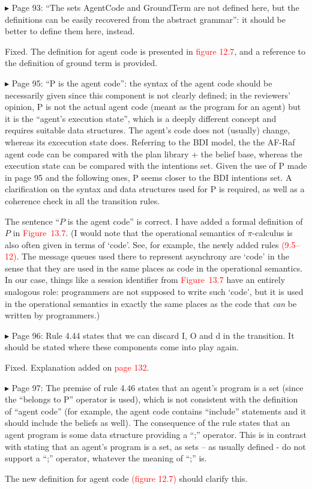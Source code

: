 \documentclass{article}
\newcommand*\R[1]{\textcolor{red}{#1}} %
\newenvironment{them}%
  {\bigskip\noindent\begingroup\color{blue}$\blacktriangleright$\enspace}%
  {\endgroup\par}
\begin{document}
\begin{them}
Page 93:
``The sets AgentCode and GroundTerm are not defined here, but the definitions
can be easily recovered from the abstract grammar'': it should be better to
define them here, instead.
\end{them}
Fixed. The definition for agent code is presented in \R{figure 12.7}, and a
reference to the definition of ground term is provided.

\begin{them}
Page 95:
``P is the agent code'': the syntax of the agent code should be necessarily given
since this component is not clearly defined; in the reviewers' opinion, P is
not the actual agent code (meant as the program for an agent) but it is the
``agent's execution state'', which is a deeply different concept and requires
suitable data structures. The agent's code does not (usually) change, whereas
its excecution state does. Referring to the BDI model, the the AF-Raf agent
code can be compared with the plan library + the belief base, whereas the
execution state can be compared with the intentions set. Given the use of P
made in page 95 and the following ones, P seems closer to the BDI intentions
set. A clarification on the syntax and data structures used for P is required,
as well as a coherence check in all the transition rules.
\end{them}
The sentence ``$P$ is the agent code'' is correct.
I have added a formal definition of $P$ in \R{Figure~13.7}.
(I would note that the operational semantics of $\pi$-calculus is also
  often given in terms of `code'.
See, for example, the newly added rules \R{(9.5--12)}.
The message queues used there to represent asynchrony are `code'
  in the sense that they are used in the same places as code in the operational semantics.
In our case, things like a session identifier from \R{Figure~13.7}
  have an entirely snalogous role:
  programmers are not supposed to write such `code',
  but it is used in the operational semantics in exactly the same
    places as the code that \emph{can} be written by programmers.)


\begin{them}
Page 96:
Rule 4.44 states that we can discard I, O and d in the transition. It should be
stated where these components come into play again.
\end{them}
Fixed. Explanation added on \R{page 132}.

\begin{them}
Page 97:
The premise of rule 4.46 states that an agent's program is a set (since the
``belongs to P'' operator is used), which is not consistent with the definition
of ``agent code'' (for example, the agent code contains ``include'' statements and
it should include the beliefs as well). The consequence of the rule states that
an agent program is some data structure providing a ``;'' operator. This is in
contrast with stating that an agent's program is a set, as sets – as usually
defined - do not support a ``;'' operator, whatever the meaning of ``;'' is.
\end{them}
The new definition for agent code \R{(figure 12.7)} should clarify this.
\end{document}
